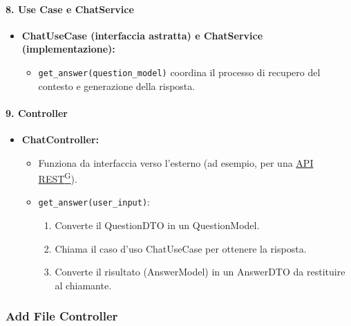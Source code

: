     \paragraph{8. Use Case e ChatService}
    \begin{itemize}
        \item \textbf{ChatUseCase (interfaccia astratta) e ChatService (implementazione):}
        \begin{itemize}
            \item \texttt{get\_answer(question\_model)} coordina il processo di recupero del contesto e generazione della risposta.
        \end{itemize}
    \end{itemize}

    \paragraph{9. Controller}
    \begin{itemize}
        \item \textbf{ChatController:}
        \begin{itemize}
            \item Funziona da interfaccia verso l’esterno (ad esempio, per una \href{https://code7crusaders.github.io/docs/\href{https://code7crusaders.github.io/docs/PB/documentazione_interna/glossario.html#pb-product-baseline}{PB\textsuperscript{G}}/documentazione_interna/glossario.html#api-rest-representational-state-transfer}{API REST\textsuperscript{G}}).
            \item \texttt{get\_answer(user\_input)}:
            \begin{enumerate}
                \item Converte il QuestionDTO in un QuestionModel.
                \item Chiama il caso d’uso ChatUseCase per ottenere la risposta.
                \item Converte il risultato (AnswerModel) in un AnswerDTO da restituire al chiamante.
            \end{enumerate}
        \end{itemize}
    \end{itemize}

    \subsubsection{Add File Controller}

